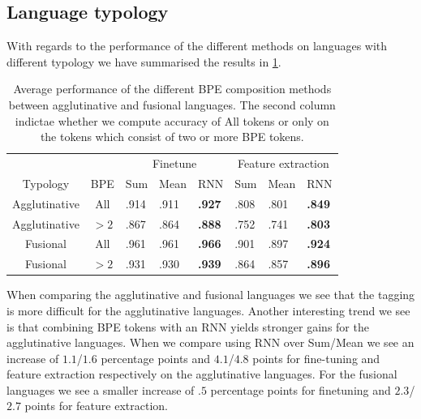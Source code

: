 \documentclass[11pt]{article}
\begin{document}
    \subsection{Language typology}
    
        With regards to the performance of the different methods on
     languages with different typology we have summarised the results
     in \cref{tab:typology_performace}. 

    \begin{table}
        \centering  
        \begin{tabular} {c|cllllll}
            & & \multicolumn{3}{c}{Finetune} & \multicolumn{3}{c}{Feature extraction} \\
            Typology & BPE & Sum & Mean & RNN & Sum & Mean & RNN \\
            \hline
            Agglutinative & All & .914 & .911 & \textbf{.927} & .808 & .801 & \textbf{.849} \\   
            Agglutinative & $>2$ & .867 & .864 & \textbf{.888} & .752 & .741 & \textbf{.803} \\
            Fusional & All & .961 & .961  & \textbf{.966} & .901 & .897 & \textbf{.924} \\
            Fusional & $>2$ & .931 & .930  & \textbf{.939} & .864 & .857 & \textbf{.896} \\
        \end{tabular}
     \caption{Average performance of the different BPE
     composition methods between agglutinative and fusional
     languages. The second column indictae whether we compute accuracy
     of All tokens or only on the tokens which consist of two or more
     BPE tokens. }
     \label{tab:typology_performace}
    \end{table}

         When comparing the agglutinative and fusional languages we
     see that the tagging is more difficult for the agglutinative
     languages. Another interesting trend we see is that combining BPE
     tokens with an RNN yields stronger gains for the agglutinative
     languages. When we compare using RNN over Sum/Mean we see an
     increase of $1.1$/$1.6$ percentage points and $4.1$/$4.8$ points
     for fine-tuning and feature extraction respectively on the
     agglutinative languages. For the fusional languages we see a
     smaller increase of $.5$ percentage points for finetuning and
     $2.3$/$2.7$ points for feature extraction.
\end{document}
